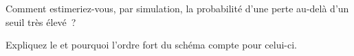 \begin{interviewq}\label{iq:qm:monte-carlo:5}
Comment estimeriez-vous, par simulation, la probabilité d'une perte au-delà d'un seuil très élevé~?
\end{interviewq}

\begin{interviewq}\label{iq:qm:monte-carlo:6}
Expliquez le  et pourquoi l'ordre fort du schéma compte pour celui-ci.
\end{interviewq}
